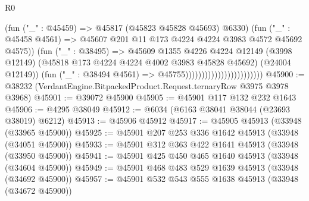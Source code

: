 \begin{lexlean}{R0}
\begin{coremodule}
                                                    (fun ("_" : @45459) =>
                                                    @45817 (@45823 @45828 @45693) @6330)
                                                    (fun ("_" : @45458 @4561) =>
                                                    @45607
                                                      @201
                                                      @11
                                                      @173
                                                      @4224
                                                      @4224
                                                      @3983
                                                      @4572
                                                      @45692
                                                      @4575))
                                                  (fun ("_" : @38495) =>
                                                  @45609
                                                    @1355
                                                    @4226
                                                    @4224
                                                    @12149
                                                    (@3998 @12149)
                                                    (@45818
                                                      @173
                                                      @4224
                                                      @4224
                                                      @4002
                                                      @3983
                                                      @45828
                                                      @45692)
                                                    (@24004 @12149))
                                                  (fun ("_" : @38494 @4561) =>
                                                  @45755))))))))))))))))))))))))
@45900 := @38232 (VerdantEngine.BitpackedProduct.Request.ternaryRow @3975 @3978 @3968)
@45901 := @39072 @45900
@45905 := @45901 @117 @132 @232 @1643
@45906 := @4295 @38049
@45912 := @6034 (@6163 @38041 @38044 (@23693 @38019) @6212)
@45913 := @45906 @45912
@45917 := @45905 @45913 (@33948 (@33965 @45900))
@45925 := @45901 @207 @253 @336 @1642 @45913 (@33948 (@34051 @45900))
@45933 := @45901 @312 @363 @422 @1641 @45913 (@33948 (@33950 @45900))
@45941 := @45901 @425 @450 @465 @1640 @45913 (@33948 (@34604 @45900))
@45949 := @45901 @468 @483 @529 @1639 @45913 (@33948 (@34692 @45900))
@45957 := @45901 @532 @543 @555 @1638 @45913 (@33948 (@34672 @45900))

\end{coremodule}
\end{lexlean}
